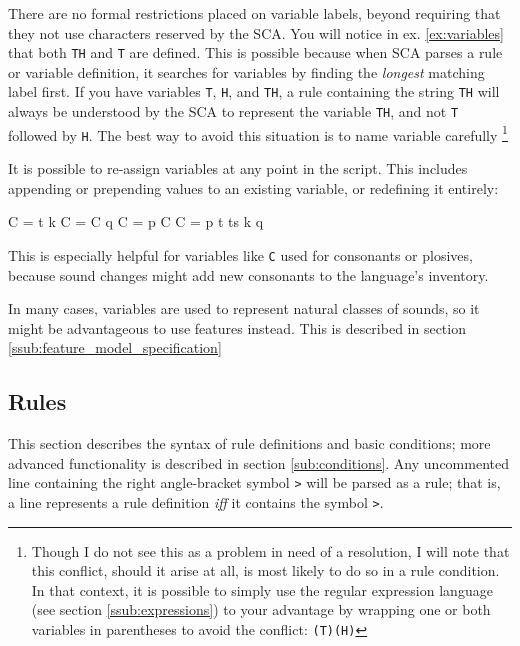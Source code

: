 \documentclass[10pt,letterpaper]{article}
\newcounter{excounter}
\newenvironment{vex}[1]{
  \vspace{1em}
  \refstepcounter{excounter}
  \noindent\makebox[3em][l]{(\arabic{excounter}\label{#1})}
  \minipage{\textwidth}
  \verbatim
}{
  \endverbatim
  \endminipage
  \vspace{1em}
}
\begin{document}
There are no formal restrictions placed on variable labels, beyond requiring that they not use characters reserved by the SCA. You will notice in ex. \ref{ex:variables} that both \texttt{TH} and \texttt{T} are defined. This is possible because when SCA parses a rule or variable definition, it searches for variables by finding the \emph{longest} matching label first. If you have variables \texttt{T}, \texttt{H}, and \texttt{TH}, a rule containing the string \texttt{TH} will always be understood by the SCA to represent the variable \texttt{TH}, and not \texttt{T} followed by \texttt{H}. The best way to avoid this situation is to name variable carefully
  \footnote{Though I do not see this as a problem in need of a resolution, I will note that this conflict, should it arise at all, is most likely to do so in a rule condition. In that context, it is possible to simply use the regular expression language (see section \ref{ssub:expressions}) to your advantage by wrapping one or both variables in parentheses to avoid the conflict: \texttt{(T)(H)}}

It is possible to re-assign variables at any point in the script. This includes appending or prepending values to an existing variable, or redefining it entirely:

\begin{vex}{ex:reassignvars}
C = t k
C = C q %
C = p C %
C = p t ts k q
\end{vex}

\noindent
This is especially helpful for variables like \texttt{C} used for consonants or plosives, because sound changes might add new consonants to the language's inventory.

In many cases, variables are used to represent natural classes of sounds, so it might be advantageous to use features instead. This is described in section \ref{ssub:feature_model_specification}


\subsection{Rules}
\label{sub:rules}
This section describes the syntax of rule definitions and basic conditions; more advanced functionality is described in section \ref{sub:conditions}. Any uncommented line containing the right angle-bracket symbol \texttt{>} will be parsed as a rule; that is, a line represents a rule definition \emph{iff} it contains the symbol \texttt{>}. 
\end{document}
